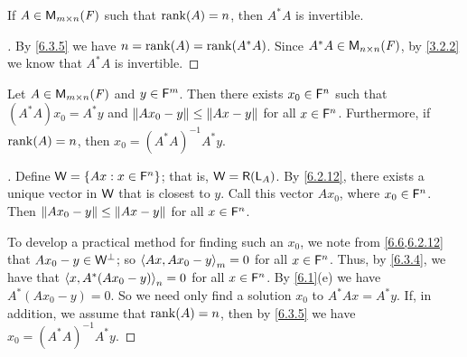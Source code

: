\begin{cor}\label{6.3.6}
	If \(A \in \MS\) such that \(\rk{A} = n\), then \(A^* A\) is invertible.
\end{cor}

\begin{proof}[]
	By \cref{6.3.5} we have \(n = \rk{A} = \rk{A^* A}\).
	Since \(A^* A \in \ms[n][n][\F]\), by \cref{3.2.2} we know that \(A^* A\) is invertible.
\end{proof}

\begin{thm}\label{6.12}
	Let \(A \in \MS\) and \(y \in \mathsf{F}^m\).
	Then there exists \(x_0 \in \mathsf{F}^n\) such that \((A^* A) x_0 = A^* y\) and \(\left\lVert A x_0 - y\right\rVert \leq \left\lVert Ax - y\right\rVert\) for all \(x \in \mathsf{F}^n\).
	Furthermore, if \(\rk{A} = n\), then \(x_0 = (A^* A)^{-1} A^* y\).
\end{thm}

\begin{proof}[]
	Define \(\mathsf{W} = \left\lbrace Ax : x \in \mathsf{F}^n\right\rbrace\);
	that is, \(\W = \rg{\L_A}\).
	By \cref{6.2.12}, there exists a unique vector in \(\mathsf{W}\) that is closest to \(y\).
	Call this vector \(A x_0\), where \(x_0 \in \mathsf{F}^n\).
	Then \(\left\lVert A x_0 - y\right\rVert \leq \left\lVert Ax - y\right\rVert\) for all \(x \in \mathsf{F}^n\).

	To develop a practical method for finding such an \(x_0\), we note from \cref{6.6,6.2.12} that \(A x_0 - y \in \mathsf{W}^{\perp}\);
	so \(\left\langle Ax, A x_0 - y\right\rangle_m = 0\) for all \(x \in \mathsf{F}^n\).
	Thus, by \cref{6.3.4}, we have that \(\left\langle x, A^* (A x_0 - y)\right\rangle_n = 0\) for all \(x \in \mathsf{F}^n\).
	By \cref{6.1}(e) we have \(A^* (A x_0 - y) = 0\).
	So we need only find a solution \(x_0\) to \(A^* Ax = A^* y\).
	If, in addition, we assume that \(\rk{A} = n\), then by \cref{6.3.5} we have \(x_0 = (A^* A)^{-1} A^* y\).
\end{proof}

